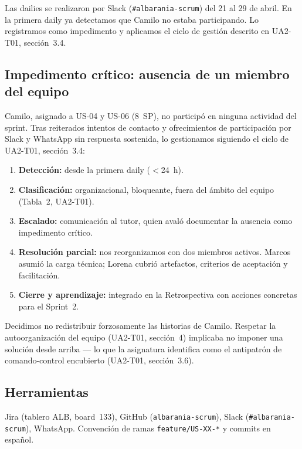 \documentclass[11pt,a4paper]{article}
\begin{document}
Las dailies se realizaron por Slack (\texttt{\#albarania-scrum}) del 21
al 29 de abril. En la primera daily ya detectamos que Camilo no estaba
participando. Lo registramos como impedimento y aplicamos el ciclo de
gestión descrito en UA2-T01, sección~3.4.

\subsection{Impedimento crítico: ausencia de un miembro del equipo}

Camilo, asignado a US-04 y US-06 (8~SP), no participó en ninguna
actividad del sprint. Tras reiterados intentos de contacto y
ofrecimientos de participación por Slack y WhatsApp sin respuesta
sostenida, lo gestionamos siguiendo el ciclo de UA2-T01, sección~3.4:

\begin{enumerate}
\item \textbf{Detección:} desde la primera daily ($<$24~h).
\item \textbf{Clasificación:} organizacional, bloqueante, fuera del
  ámbito del equipo (Tabla~2, UA2-T01).
\item \textbf{Escalado:} comunicación al tutor, quien avaló documentar
  la ausencia como impedimento crítico.
\item \textbf{Resolución parcial:} nos reorganizamos con dos miembros
  activos. Marcos asumió la carga técnica; Lorena cubrió artefactos,
  criterios de aceptación y facilitación.
\item \textbf{Cierre y aprendizaje:} integrado en la Retrospectiva con
  acciones concretas para el Sprint~2.
\end{enumerate}

Decidimos no redistribuir forzosamente las historias de Camilo. Respetar
la autoorganización del equipo (UA2-T01, sección~4) implicaba no imponer
una solución desde arriba --- lo que la asignatura identifica como el
antipatrón de comando-control encubierto (UA2-T01, sección~3.6).

\subsection{Herramientas}

Jira (tablero ALB, board~133), GitHub (\texttt{albarania-scrum}),
Slack (\texttt{\#albarania-scrum}), WhatsApp. Convención de ramas
\texttt{feature/US-XX-*} y commits en español.

\end{document}
